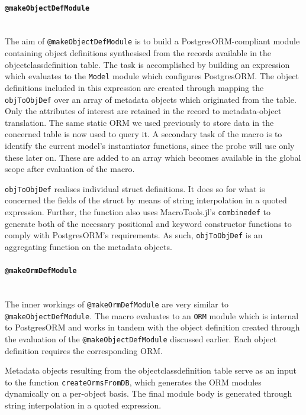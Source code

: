 \documentclass{juliacon}
\begin{document}
\paragraph{\textnormal{\texttt{@makeObjectDefModule}}}\hfill\\

The aim of \texttt{@makeObjectDefModule} is to build a PostgresORM-compliant module containing object definitions synthesised from the records available in the objectclassdefinition table. The task is accomplished by building an expression which evaluates to the \texttt{Model} module which configures PostgresORM. The object definitions included in this expression are created through mapping the \texttt{objToObjDef} over an array of metadata objects which originated from the table. Only the attributes of interest are retained in the record to metadata-object translation. The same static ORM we used previously to store data in the concerned table is now used to query it. A secondary task of the macro is to identify the current model's instantiator functions, since the probe will use only these later on. These are added to an array which becomes available in the global scope after evaluation of the macro. \vskip 6pt

\texttt{objToObjDef} realises individual struct definitions. It does so for what is concerned the fields of the struct by means of string interpolation in a quoted expression. Further, the function also uses MacroTools.jl's \texttt{combinedef} to generate both of the necessary positional and keyword constructor functions to comply with PostgresORM's requirements. As such, \texttt{objToObjDef} is an aggregating function on the metadata objects.\vskip 6pt

\paragraph{\textnormal{\texttt{@makeOrmDefModule}}}\hfill\\

The inner workings of \texttt{@makeOrmDefModule} are very similar to \texttt{@makeObjectDefModule}. The macro evaluates to an \texttt{ORM} module which is internal to PostgresORM and works in tandem with the object definition created through the evaluation of the \texttt{@makeObjectDefModule} discussed earlier. Each object definition requires the corresponding ORM.\vskip 6pt

Metadata objects resulting from the objectclassdefinition table serve as an input to the function \texttt{createOrmsFromDB}, which generates the ORM modules dynamically on a per-object basis. The final module body is generated through string interpolation in a quoted expression.\vskip 6pt
\end{document}
